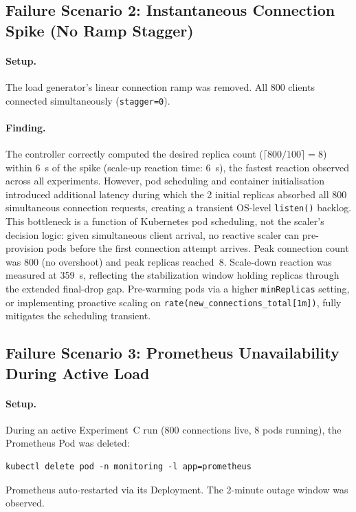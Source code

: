\documentclass[twocolumn]{svjour3}
\begin{document}
\subsection{Failure Scenario 2: Instantaneous Connection Spike (No Ramp Stagger)}

\paragraph{Setup.} The load generator's linear connection ramp was removed. All 800 clients connected simultaneously (\texttt{stagger=0}).

\paragraph{Finding.} The controller correctly computed the desired replica count ($\lceil800/100\rceil=8$) within 6~s of the spike (scale-up reaction time: 6~s), the fastest reaction observed across all experiments.  However, pod scheduling and container initialisation introduced additional latency during which the 2 initial replicas absorbed all 800 simultaneous connection requests, creating a transient OS-level \texttt{listen()} backlog.  This bottleneck is a function of Kubernetes pod scheduling, not the scaler's decision logic: given simultaneous client arrival, no reactive scaler can pre-provision pods before the first connection attempt arrives.  Peak connection count was 800 (no overshoot) and peak replicas reached~8.  Scale-down reaction was measured at 359~s, reflecting the stabilization window holding replicas through the extended final-drop gap.  Pre-warming pods via a higher \texttt{minReplicas} setting, or implementing proactive scaling on \texttt{rate(new\_connections\_total[1m])}, fully mitigates the scheduling transient.

\subsection{Failure Scenario 3: Prometheus Unavailability During Active Load}

\paragraph{Setup.} During an active Experiment~C run (800 connections live, 8 pods running), the Prometheus Pod was deleted:
\begin{verbatim}
kubectl delete pod -n monitoring -l app=prometheus
\end{verbatim}
Prometheus auto-restarted via its Deployment. The 2-minute outage window was observed.
\end{document}
